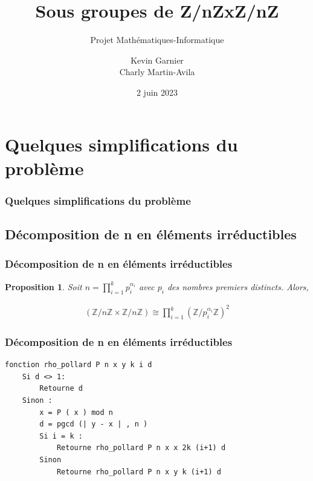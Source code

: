 \documentclass{beamer}
\title{
    Sous groupes de Z/nZxZ/nZ
}
\subtitle{Projet Mathématiques-Informatique}
\institute{Université Paris Cité}
\author[Kevin, Charly]{
    Kevin Garnier \\    Charly Martin-Avila
}
\date{2 juin 2023}
\newtheorem{prp}{Proposition}
\begin{document}
\tableofcontents


\section{Quelques simplifications du problème}
\begin{frame}
\frametitle{Quelques simplifications du problème}
\tableofcontents[currentsection]
\end{frame}


\subsection{Décomposition de n en éléments irréductibles}
\begin{frame}
    \frametitle{Décomposition de n en éléments irréductibles}
    \begin{prp}
        Soit $n = \prod\limits_{i = 1}^k p_i^{\alpha_i}$ avec $p_i$ des nombres premiers distincts. Alors,
    
        \begin{align*}
            (\mathbb{Z}/n\mathbb{Z} \times \mathbb{Z}/n\mathbb{Z})
            \cong
            \prod\limits_{i = 1}^k (\mathbb{Z}/p_i^{\alpha_i}\mathbb{Z})^{2}
        \end{align*}
    \end{prp}
\end{frame}


\begin{frame}[fragile]
    \frametitle{Décomposition de n en éléments irréductibles}
    \begin{verbatim}
fonction rho_pollard P n x y k i d
    Si d <> 1:
        Retourne d
    Sinon :
        x = P ( x ) mod n
        d = pgcd (| y - x | , n )
        Si i = k :
            Retourne rho_pollard P n x x 2k (i+1) d
        Sinon 
            Retourne rho_pollard P n x y k (i+1) d
    \end{verbatim}
\end{frame}
\end{document}
